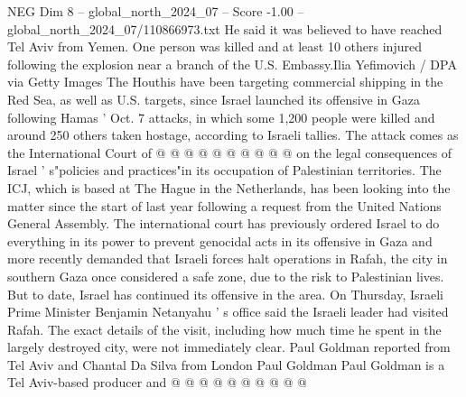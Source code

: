 \begin{textsample}{NEG Dim 8 – global\_north\_2024\_07 – Score -1.00 – global\_north\_2024\_07/110866973.txt}
He said it was believed to have reached Tel Aviv from Yemen.
One person was killed and at least 10 others injured following the explosion near a branch of the U.S.
Embassy.Ilia Yefimovich / DPA via Getty Images The Houthis have been targeting commercial shipping in the Red Sea, as well as U.S. targets, since Israel launched its offensive in Gaza following Hamas ' Oct. 7 attacks, in which some 1,200 people were killed and around 250 others taken hostage, according to Israeli tallies.
The attack comes as the International Court of @ @ @ @ @ @ @ @ @ @ on the legal consequences of Israel ' s"policies and practices"in its occupation of Palestinian territories.
The ICJ, which is based at The Hague in the Netherlands, has been looking into the matter since the start of last year following a request from the United Nations General Assembly.
The international court has previously ordered Israel to do everything in its power to prevent genocidal acts in its offensive in Gaza and more recently demanded that Israeli forces halt operations in Rafah, the city in southern Gaza once considered a safe zone, due to the risk to Palestinian lives.
But to date, Israel has continued its offensive in the area.
On Thursday, Israeli Prime Minister Benjamin Netanyahu ' s office said the Israeli leader had visited Rafah.
The exact details of the visit, including how much time he spent in the largely destroyed city, were not immediately clear.
Paul Goldman reported from Tel Aviv and Chantal Da Silva from London Paul Goldman Paul Goldman is a Tel Aviv-based producer and @ @ @ @ @ @ @ @ @ @

\end{textsample}
